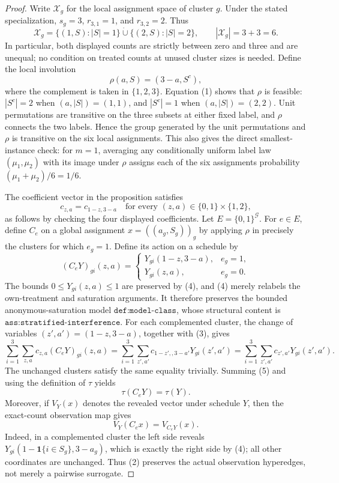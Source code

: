 \documentclass{article}
\begin{document}
\begin{proof}
Write \(\mathcal X_g\) for the local assignment space of cluster \(g\).  Under the stated specialization, \(s_g=3\), \(r_{3,1}=1\), and \(r_{3,2}=2\).  Thus
\[
 \mathcal X_g=\{(1,S):|S|=1\}\mathbin{\dot\cup}
                 \{(2,S):|S|=2\},
 \qquad |\mathcal X_g|=3+3=6.                                      \tag{1}
\]
In particular, both displayed counts are strictly between zero and three and are unequal; no condition on treated counts at unused cluster sizes is needed.  Define the local involution
\[
 \rho(a,S)=(3-a,S^c),                                                \tag{2}
\]
where the complement is taken in \(\{1,2,3\}\).  Equation (1) shows that
\(\rho\) is feasible: \(|S^c|=2\) when \((a,|S|)=(1,1)\), and
\(|S^c|=1\) when \((a,|S|)=(2,2)\).  Unit permutations are transitive on
the three subsets at either fixed label, and \(\rho\) connects the two
labels.  Hence the group generated by the unit permutations and \(\rho\)
is transitive on the six local assignments.  This also gives the direct
smallest-instance check: for \(m=1\), averaging any conditionally uniform
label law \((\mu_1,\mu_2)\) with its image under \(\rho\) assigns each of
the six assignments probability
\((\mu_1+\mu_2)/6=1/6\).

The coefficient vector in the proposition satisfies
\[
 c_{z,a}=c_{1-z,3-a}
 \quad\text{for every }(z,a)\in\{0,1\}\times\{1,2\},                \tag{3}
\]
as follows by checking the four displayed coefficients.  Let
\(E=\{0,1\}^{\mathcal G}\).  For \(e\in E\), define \(C_e\) on a global
assignment \(x=((a_g,S_g))_g\) by applying \(\rho\) in precisely the
clusters for which \(e_g=1\).  Define its action on a schedule by
\[
 (C_eY)_{gi}(z,a)=
 \begin{cases}
 Y_{gi}(1-z,3-a),&e_g=1,\\
 Y_{gi}(z,a),&e_g=0.
 \end{cases}                                                        \tag{4}
\]
The bounds \(0\le Y_{gi}(z,a)\le1\) are preserved by (4), and (4) merely
relabels the own-treatment and saturation arguments.  It therefore
preserves the bounded anonymous-saturation model
\(\texttt{def:model-class}\), whose structural content is
\(\texttt{ass:stratified-interference}\).  For each complemented cluster,
the change of variables \((z',a')=(1-z,3-a)\), together with (3), gives
\[
 \sum_{i=1}^3\sum_{z,a}c_{z,a}(C_eY)_{gi}(z,a)
 =\sum_{i=1}^3\sum_{z',a'}c_{1-z',,3-a'}Y_{gi}(z',a')
 =\sum_{i=1}^3\sum_{z',a'}c_{z',a'}Y_{gi}(z',a').                    \tag{5}
\]
The unchanged clusters satisfy the same equality trivially.  Summing (5)
and using the definition of \(\tau\) yields
\[
 \tau(C_eY)=\tau(Y).                                                 \tag{6}
\]
Moreover, if \(V_Y(x)\) denotes the revealed vector under schedule \(Y\),
then the exact-count observation map gives
\[
 V_Y(C_ex)=V_{C_eY}(x).                                              \tag{7}
\]
Indeed, in a complemented cluster the left side reveals
\(Y_{gi}(1-\mathbf 1\{i\in S_g\},3-a_g)\), which is exactly the right
side by (4); all other coordinates are unchanged.  Thus (2) preserves the
actual observation hyperedges, not merely a pairwise surrogate.


\end{proof}
\end{document}
